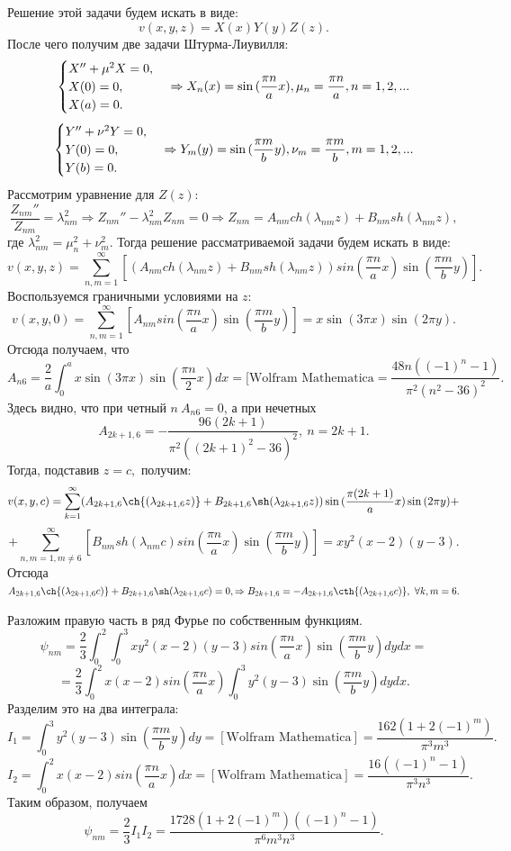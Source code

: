 \documentclass[11pt]{article}
\begin{document}
Решение этой задачи будем искать в виде: $$v(x,y,z)=X(x)Y(y)Z(z).$$
После чего получим две задачи Штурма-Лиувилля:
$$\begin{cases}
    X''+\mu^2X=0,\\
    X(0)=0,\\
    X(a)=0.
\end{cases}\Rightarrow
X_n(x)=\sin{(\frac{\pi n}{a}x)},\\
\mu_n=\frac{\pi n}{a}, n=1, 2, ...$$
$$\begin{cases}
    Y''+\nu^2Y=0,\\
    Y(0)=0,\\
    Y(b)=0.
\end{cases}\Rightarrow
Y_m(y)=\sin{(\frac{\pi m}{b}y)},\\
\nu_m=\frac{\pi m}{b}, m=1, 2, ...$$
Рассмотрим уравнение для $Z(z)$:
$$\frac{Z_{nm}''}{Z_{nm}}=\lambda_{nm}^2\Rightarrow Z_{nm}''-\lambda_{nm}^2Z_{nm}=0\Rightarrow Z_{nm}=A_{nm}ch(\lambda_{nm}z)+B_{nm}sh(\lambda_{nm}z),$$
где $\lambda^2_{nm}=\mu_n^2+\nu_m^2.$
Тогда решение рассматриваемой задачи будем искать в виде:
$$v(x,y,z)=\sum_{n,m=1}^\infty[( A_{nm}ch(\lambda_{nm}z)+B_{nm}sh(\lambda_{nm}z))sin{(\frac{\pi n}{a}x)}\sin{(\frac{\pi m}{b}y)}].$$
Воспользуемся граничными условиями на $z$:
$$v(x,y,0)=\sum_{n,m=1}^\infty[ A_{nm}sin{(\frac{\pi n}{a}x)}\sin{(\frac{\pi m}{b}y)}]=x\sin{(3\pi x)}\sin{(2\pi y)}.$$
Отсюда получаем, что $$A_{n6}=
    \frac{2}{a} \int_0^a x\sin(3\pi x)\sin(\frac{\pi n}{2}x)dx=[\text{Wolfram Mathematica}=\frac{48 n ((-1)^n-1)}{\pi ^2 \left(n^2-36\right)^2}.$$ 
Здесь видно, что при четный $n\ A_{n6}=0$, а при нечетных
$$A_{2k+1,6}=-\frac{96 (2k+1)}{\pi ^2 \left((2k+1)^2-36\right)^2},\ n=2k+1.$$
Тогда, подставив $z=c,$ получим:
$$v(x,y,c)=\sum_{k=1}^\infty (A_{2k+1,6}\ch{(\lambda_{2k+1,6}z)}+B_{2k+1,6}\sh(\lambda_{2k+1,6}z))\sin{(\frac{\pi (2k+1)}{a} x)}\sin{(2\pi y)}+$$
$$+\sum_{n,m=1, m \neq 6}^\infty[ B_{nm}sh(\lambda_{nm}c)sin{(\frac{\pi n}{a}x)}\sin{(\frac{\pi m}{b}y)}]=xy^2(x-2)(y-3).$$
Отсюда $A_{2k+1, 6}\ch{(\lambda_{2k+1, 6}c)}+B_{2k+1,6}\sh(\lambda_{2k+1, 6}c)=0, \Rightarrow B_{2k+1,6}=-A_{2k+1,6}\cth{(\lambda_{2k+1,6}c)},\ \forall k, m=6.$

Разложим правую часть в ряд Фурье по собственным функциям.
$$\psi_{nm}=\frac{2}{3}\int_0^2\int_0^3xy^2(x-2)(y-3)sin{(\frac{\pi n}{a}x)}\sin{(\frac{\pi m}{b}y)}dydx=$$
$$=\dfrac23\int_0^2x(x-2)sin{(\frac{\pi n}{a}x)}\int_0^3y^2(y-3)\sin{(\frac{\pi m}{b}y)}dydx.$$
Разделим это на два интеграла:
$$I_1=\int_0^3y^2(y-3)\sin{(\frac{\pi m}{b}y)}dy=[\text{Wolfram Mathematica}]=\frac{162 (1+2(-1)^m)}{\pi ^3 m^3}.$$
$$I_2=\int_0^2x(x-2)sin{(\frac{\pi n}{a}x)}dx=[\text{Wolfram Mathematica}]=\frac{16 ((-1)^n-1)}{\pi ^3 n^3}.$$
Таким образом, получаем
$$\psi_{nm}=\dfrac23I_1I_2=\frac{1728 (1+2(-1)^m)((-1)^n-1)}{\pi ^6 m^3n^3}.$$
\end{document}
